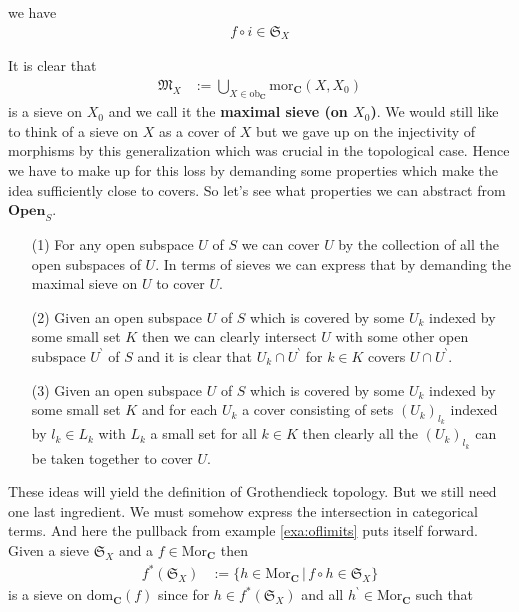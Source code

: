 \begin{exa}
\begin{enumerate}
we have
\begin{align*}
  f
  \circ
  i
  \in
  \mathfrak{S}_{X}
\end{align*}
\end{enumerate}
It is clear that
\begin{align*}
  \mathfrak{M}_{X}
  &:=
  \bigcup_{X \in \mathrm{ob}_{\mathbf{C}}}
  \mathrm{mor}_{\mathbf{C}}(X,X_{0})
\end{align*}
is a sieve on $X_{0}$ and we call it the \textbf{maximal sieve (on $X_{0}$)}. We would still like to think of a sieve on $X$ as a cover of $X$ but we gave up on the injectivity of morphisms by this generalization which was crucial in the topological case. Hence we have to make up for this loss by demanding some properties which make the idea sufficiently close to covers. So let's see what properties we can abstract from $\mathbf{Open}_{S}$.
\begin{enumerate}
\item[(1)]
For any open subspace $U$ of $S$ we can cover $U$ by the collection of all the open subspaces of $U$. In terms of sieves we can express that by demanding the maximal sieve on $U$ to cover $U$.
\item[(2)]
Given an open subspace $U$ of $S$ which is covered by some $U_{k}$ indexed by some small set $K$ then we can clearly intersect $U$ with some other open subspace $U^{\backprime}$ of $S$ and it is clear that $U_{k} \cap U^{\backprime}$ for $k \in K$ covers $U \cap U^{\backprime}$.
\item[(3)]
Given an open subspace $U$ of $S$ which is covered by some $U_{k}$ indexed by some small set $K$ and for each $U_{k}$ a cover consisting of sets $(U_{k})_{l_{k}}$ indexed by $l_{k} \in L_{k}$ with $L_{k}$ a small set for all $k \in K$ then clearly all the $(U_{k})_{l_{k}}$ can be taken together to cover $U$.
\end{enumerate}
These ideas will yield the definition of Grothendieck topology. But we still need one last ingredient. We must somehow express the intersection in categorical terms. And here the pullback from example \ref{exa:oflimits} puts itself forward. Given a sieve $\mathfrak{S}_{X}$ and a $f \in \mathrm{Mor}_{\mathbf{C}}$ then 
\begin{align*}
  f^{\ast}(\mathfrak{S}_{X})
  &:=
  \lbrace
      h
      \in
      \mathrm{Mor}_{\mathbf{C}}
    \,
    \vert
    \,
      f
      \circ
      h
      \in
      \mathfrak{S}_{X}
  \rbrace
\end{align*}
is a sieve on $\mathrm{dom}_{\mathbf{C}}(f)$ since for $h \in f^{\ast}(\mathfrak{S}_{X})$ and all $h^{\backprime} \in \mathrm{Mor}_{\mathbf{C}}$ such that

\end{exa}
